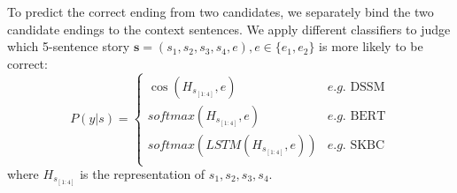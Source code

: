 To predict the correct ending from two candidates,
we separately bind the two candidate endings to the context sentences.
We apply different classifiers to judge
which 5-sentence story $\textbf{s}=(s_1, s_2, s_3, s_4, e),e\in\{e_1,e_2\}$
is more likely to be correct:
\begin{equation}
P\left ( y|s \right )=\left\{\begin{matrix}
\cos \left ( H_{s_{[1:4]}},e \right )&e.g.\text{ DSSM}\\ 
softmax\left ( H_{s_{[1:4]}},e \right )&e.g.\text{ BERT}\\
softmax\left (LSTM\left ( H_{s_{[1:4]}},e \right ) \right ) &e.g.\text{ SKBC}\\
\end{matrix}\right.
\end{equation}
where $H_{s_{[1:4]}}$ is the representation of ${s_1, s_2, s_3, s_4}$.
